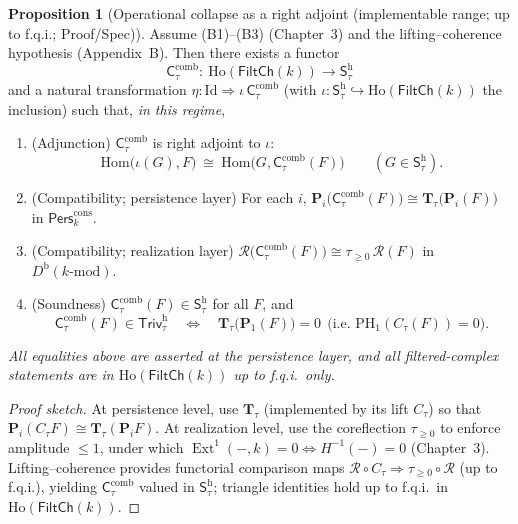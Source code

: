 \documentclass[11pt]{article}
\numberwithin{equation}{section}
\theoremstyle{plain}
\theoremstyle{definition}
\theoremstyle{remark}
\DeclareMathOperator{\Ext}{Ext}
\newcommand{\Pers}{\mathsf{Pers}}
\theoremstyle{plain}
\theoremstyle{definition}
\numberwithin{equation}{section}
\newtheorem{proposition}[theorem]{Proposition}
\theoremstyle{definition}
\numberwithin{equation}{section}
\theoremstyle{plain}
\theoremstyle{definition}
\theoremstyle{remark}
\begin{document}
\begin{proposition}[Operational collapse as a right adjoint (implementable range; up to f.q.i.; Proof/Spec)]\label{prop:operational-coreflection}
Assume \textup{(B1)–(B3)} (Chapter~3) and the lifting–coherence hypothesis (Appendix~B).
Then there exists a functor
\[
\mathsf{C}_\tau^{\mathrm{comb}}:\ \mathrm{Ho}(\mathsf{FiltCh}(k))\longrightarrow \mathsf{S}_\tau^{\mathrm{h}}
\]
and a natural transformation $\eta:\mathrm{Id}\Rightarrow \iota\,\mathsf{C}_\tau^{\mathrm{comb}}$ (with $\iota:\mathsf{S}_\tau^{\mathrm{h}}\hookrightarrow \mathrm{Ho}(\mathsf{FiltCh}(k))$ the inclusion) such that, \emph{in this regime},
\begin{enumerate}
  \item \textup{(Adjunction)} $\mathsf{C}_\tau^{\mathrm{comb}}$ is right adjoint to $\iota$:
  \[
  \mathrm{Hom}\!\big(\iota(G),F\big)\ \cong\ \mathrm{Hom}\!\big(G,\mathsf{C}_\tau^{\mathrm{comb}}(F)\big)\qquad(G\in\mathsf{S}_\tau^{\mathrm{h}}).
  \]
  \item \textup{(Compatibility; persistence layer)} For each $i$, $\mathbf{P}_i\!\big(\mathsf{C}_\tau^{\mathrm{comb}}(F)\big)\cong \mathbf{T}_\tau\!\big(\mathbf{P}_i(F)\big)$ in $\Pers^{\mathrm{cons}}_k$.
  \item \textup{(Compatibility; realization layer)} $\mathcal{R}\!\big(\mathsf{C}_\tau^{\mathrm{comb}}(F)\big)\cong \tau_{\ge 0}\,\mathcal{R}(F)$ in $D^{\mathrm{b}}(k\text{-mod})$.
  \item \textup{(Soundness)} $\mathsf{C}_\tau^{\mathrm{comb}}(F)\in \mathsf{S}_\tau^{\mathrm{h}}$ for all $F$, and
  \[
  \mathsf{C}_\tau^{\mathrm{comb}}(F)\in \mathsf{Triv}_\tau^{\mathrm{h}}\quad\Longleftrightarrow\quad \mathbf{T}_\tau\!\big(\mathbf{P}_1(F)\big)=0\ \ \big(\text{i.e.\ } \mathrm{PH}_1(C_\tau(F))=0\big).
  \]
\end{enumerate}
\emph{All equalities above are asserted at the persistence layer, and all filtered-complex statements are in $\mathrm{Ho}(\mathsf{FiltCh}(k))$ up to f.q.i.\ only.}
\end{proposition}

\begin{proof}[Proof sketch]
At persistence level, use $\mathbf{T}_\tau$ (implemented by its lift $C_\tau$) so that $\mathbf{P}_i(C_\tau F)\cong \mathbf{T}_\tau(\mathbf{P}_i F)$. At realization level, use the coreflection $\tau_{\ge 0}$ to enforce amplitude $\le 1$, under which $\Ext^1(-,k)=0\iff H^{-1}(-)=0$ (Chapter~3). Lifting–coherence provides functorial comparison maps $\mathcal{R}\circ C_\tau \Rightarrow \tau_{\ge 0}\circ \mathcal{R}$ (up to f.q.i.), yielding $\mathsf{C}_\tau^{\mathrm{comb}}$ valued in $\mathsf{S}_\tau^{\mathrm{h}}$; triangle identities hold up to f.q.i.\ in $\mathrm{Ho}(\mathsf{FiltCh}(k))$.
\end{proof}
\end{document}
